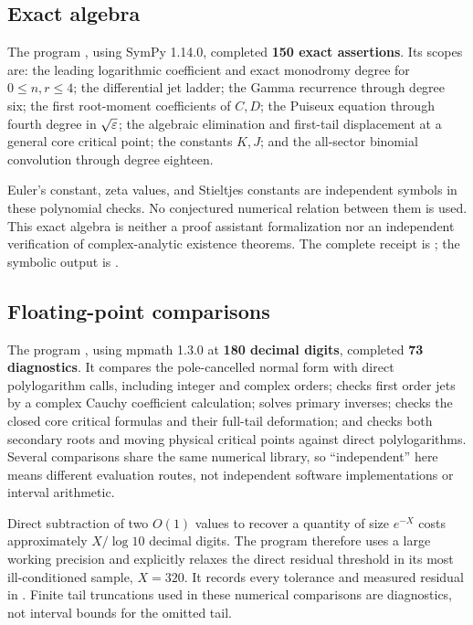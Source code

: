 \documentclass[11pt,a4paper]{article}
\numberwithin{equation}{section}
\theoremstyle{definition}\newtheorem{definition}[theorem]{Definition}
\theoremstyle{remark}\newtheorem{remark}[theorem]{Remark}
\begin{document}
\subsection{Exact algebra}
The program , using SymPy 1.14.0, completed
\textbf{150 exact assertions}. Its scopes are: the leading logarithmic
coefficient and exact monodromy degree for $0\le n,r\le4$; the differential
jet ladder; the Gamma recurrence through degree six; the first root-moment
coefficients of $C,D$; the Puiseux equation through fourth degree in
$\sqrt{\varepsilon}$; the algebraic elimination and first-tail displacement at a
general core critical point; the constants $K,J$; and the all-sector
binomial convolution through degree eighteen.

Euler's constant, zeta values, and Stieltjes constants are independent
symbols in these polynomial checks. No conjectured numerical relation
between them is used. This exact algebra is neither a proof assistant
formalization nor an independent verification of complex-analytic
existence theorems. The complete receipt is
; the symbolic output is
.

\subsection{Floating-point comparisons}
The program , using mpmath 1.3.0 at
\textbf{180 decimal digits}, completed \textbf{73 diagnostics}.
It compares the pole-cancelled normal form with direct polylogarithm
calls, including integer and complex orders; checks first order jets by
a complex Cauchy coefficient calculation; solves primary inverses;
checks the closed core critical formulas and their full-tail deformation;
and checks both secondary roots and moving physical critical points
against direct polylogarithms. Several comparisons share the same numerical
library, so ``independent'' here means different evaluation routes, not
independent software implementations or interval arithmetic.

Direct subtraction of two $O(1)$ values to recover a quantity of size
$e^{-X}$ costs approximately $X/\log 10$ decimal digits. The program
therefore uses a large working precision and explicitly relaxes the
direct residual threshold in its most ill-conditioned sample, $X=320$.
It records every tolerance and measured residual in
. Finite tail truncations used in
these numerical comparisons are diagnostics, not interval bounds for the
omitted tail.
\end{document}
